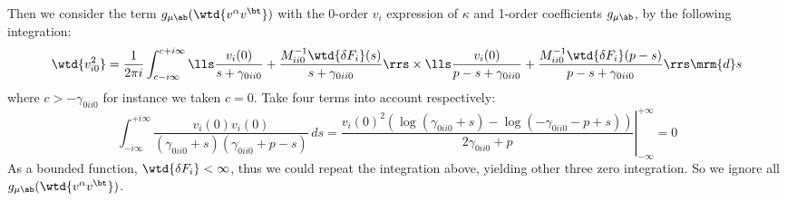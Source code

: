 Then we consider the term $g_{\mu\ab} (\wtd{v^\alpha v^\bt})$ with the 0-order $v_i$ expression of $\kappa$ and 1-order coefficients $g_{\mu\ab}$, by the following integration:
$$ \wtd{v_{i0}^2} = \frac{1}{2\pi i} \int_{c-i\infty}^{c+i\infty} \lls \frac{v_i(0)}{s+\gamma_{0ii0}} + \frac{M^{-1}_{ii0} \wtd{\delta F_i}(s)}{s+\gamma_{0ii0}} \rrs \times \lls \frac{v_i(0)}{p-s+\gamma_{0ii0}} + \frac{M^{-1}_{ii0} \wtd{\delta F_i}(p-s) }{p-s+\gamma_{0ii0}} \rrs \mrm{d}s $$
where $c>-\gamma_{0ii0}$ for instance we taken $c=0$. Take four terms into account respectively:
$$ \int_{-i\infty}^{+i\infty} \frac{v_i(0) v_i(0)}{(\gamma_{0ii0}+s) (\gamma_{0ii0}+p-s)} \, ds = \left. \frac{v_i(0)^2 (\log (\gamma_{0ii0}+s)-\log (-\gamma_{0ii0}-p+s))}{2 \gamma_{0ii0}+p} \right\vert_{-\infty}^{+\infty} = 0 $$
As a bounded function, $\wtd{\delta F_i} < \infty$, thus we could repeat the integration above, yielding other three zero integration. So we ignore all $g_{\mu\ab} (\wtd{v^\alpha v^\bt})$. %



